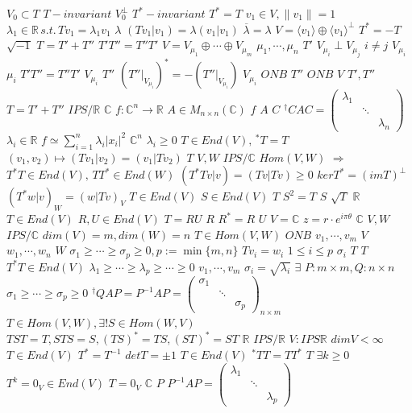 \documentclass{article}
\begin{document}
$V_0 \subset T$
$T-invariant$
$V_0^{\perp}$
$T^*-invariant$
$T^*=T$
$v_1 \in V,\lVert v_1 \rVert =1$
$\lambda_1 \in \mathbb{R}\, s.t.\, Tv_1=\lambda_1v_1$
$\lambda$
$(Tv_1|v_1)=\lambda(v_1|v_1)$
$\overline{\lambda}=\lambda$
$V=\langle v_1 \rangle \oplus \langle v_1 \rangle^{\perp}$
$T^*=-T$
$\sqrt{-1}$
$T=T'+T''$
$T'T''=T''T'$
$V=V_{\mu_1} \oplus \cdots \oplus V_{\mu_m}$
$\mu_1, \cdots, \mu_n$
$T'$
$V_{\mu_i} \perp V_{\mu_j}$
$i \neq j$
$V_{\mu_i}$
$\mu_i$
$T'T''=T''T'$
$V_{\mu_i}$
$T''$
$(T''|_{V_{\mu_i}})^*=-(T''|_{V_{\mu_i}})$
$V_{\mu_i}$
$ONB$
$T''$
$ONB$
$V$
$T',T''$
$T=T'+T''$
$IPS/\mathbb{R}$
$\mathbb{C}$
$f:\mathbb{C}^n \rightarrow \mathbb{R}$
$A \in M_{n \times n}(\mathbb{C})$
$f$
$A$
$C$
$^\dagger CAC=\begin{pmatrix}\lambda_1&&\\&\ddots&\\&&\lambda_n\end{pmatrix}$
$\lambda_i \in \mathbb{R}$
$f \simeq \sum\limits_{i=1}^n \lambda_i|x_i|^2$
$\mathbb{C}^n$
$\lambda_i \geq 0$
$T \in End(V),\,^*T=T$
$(v_1,v_2) \mapsto (Tv_1|v_2)=(v_1|Tv_2)$
$T$
$V,W$
$IPS/\mathbb{C}$
$Hom(V,W)$
$\Rightarrow$
$T^*T \in End(V),\,TT^* \in End(W)$
$(T^*Tv|v)=(Tv|Tv) \geq 0$
$kerT^*=(imT)^\perp$
$(T^*w|v)_W=(w|Tv)_V$
$T\in End(V)$
$S \in End(V)$
$T$
$S^2=T$
$S$
$\sqrt{T}$
$\mathbb{R}$
$T \in End(V)$
$R,U \in End(V)$
$T=RU$
$R$
$R^*=R$
$U$
$V=\mathbb{C}$
$z=r \cdot e^{i\pi\theta}$
$\mathbb{C}$
$V,W$
$IPS/\mathbb{C}$
$dim(V)=m,dim(W)=n$
$T \in Hom(V,W)$
$ONB$
$v_1,\cdots,v_m$
$V$
$w_1,\cdots,w_n$
$W$
$\sigma_1 \geq \cdots \geq \sigma_p \geq 0,p:=\min\{m,n\}$
$Tv_i=w_i$
$1 \leq i \leq p$
$\sigma_i$
$T$
$T$
$T^*T \in End(V)$
$\lambda_1 \geq \cdots \geq \lambda_p \geq \cdots \geq 0$
$v_1,\cdots,v_m$
$\sigma_i=\sqrt{\lambda_i}$
$\exists$
$P:m \times m,Q:n \times n$
$\sigma_1 \geq \cdots \geq \sigma_p \geq 0$
$^\dagger QAP=P^{-1}AP=\begin{pmatrix}\sigma_1&&\\&\ddots&\\&&\sigma_p\end{pmatrix}_{n \times m}$
$T \in Hom(V,W),\exists!S \in Hom(W,V)$
$TST=T,STS=S,(TS)^*=TS,(ST)^*=ST$
$\mathbb{R}$
$IPS/\mathbb{R}$
$V:IPS\mathbb{R}$
$dimV<\infty$
$T \in End(V)$
$T^*=T^{-1}$
$detT = \pm 1$
$T \in End(V)$
$^*TT=TT^*$
$T$
$\exists k \geq 0$
$T^k=0_V \in End(V)$
$T=0_V$
$\mathbb{C}$
$P$
$P^{-1}AP=\begin{pmatrix}\lambda_1&&\\&\ddots&\\&&\lambda_p\end{pmatrix}$
\end{document}
